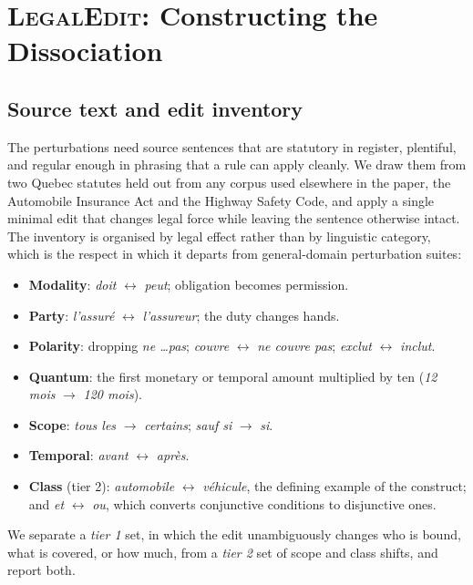 \documentclass[11pt]{article}
\begin{document}
\section{\textsc{LegalEdit}: Constructing the Dissociation}
\label{sec:legaledit}

\subsection{Source text and edit inventory}

The perturbations need source sentences that are statutory in register,
plentiful, and regular enough in phrasing that a rule can apply cleanly. We draw
them from two Quebec statutes held out from any corpus used elsewhere in the
paper, the Automobile Insurance Act and the Highway Safety Code, and apply a
single minimal edit that changes legal force while leaving the sentence
otherwise intact. The inventory is organised by legal effect rather than by
linguistic category, which is the respect in which it departs from general-domain
perturbation suites:

\begin{itemize}\itemsep2pt
\item \textbf{Modality}: \emph{doit} $\leftrightarrow$ \emph{peut}; obligation
      becomes permission.
\item \textbf{Party}: \emph{l'assur\'e} $\leftrightarrow$ \emph{l'assureur};
      the duty changes hands.
\item \textbf{Polarity}: dropping \emph{ne \dots pas}; \emph{couvre}
      $\leftrightarrow$ \emph{ne couvre pas}; \emph{exclut} $\leftrightarrow$
      \emph{inclut}.
\item \textbf{Quantum}: the first monetary or temporal amount multiplied by ten
      (\emph{12 mois} $\rightarrow$ \emph{120 mois}).
\item \textbf{Scope}: \emph{tous les} $\rightarrow$ \emph{certains};
      \emph{sauf si} $\rightarrow$ \emph{si}.
\item \textbf{Temporal}: \emph{avant} $\leftrightarrow$ \emph{apr\`es}.
\item \textbf{Class} (tier 2): \emph{automobile} $\leftrightarrow$
      \emph{v\'ehicule}, the defining example of the construct; and \emph{et}
      $\leftrightarrow$ \emph{ou}, which converts conjunctive conditions to
      disjunctive ones.
\end{itemize}

We separate a \emph{tier 1} set, in which the edit unambiguously changes who is
bound, what is covered, or how much, from a \emph{tier 2} set of scope and class
shifts, and report both.
\end{document}
